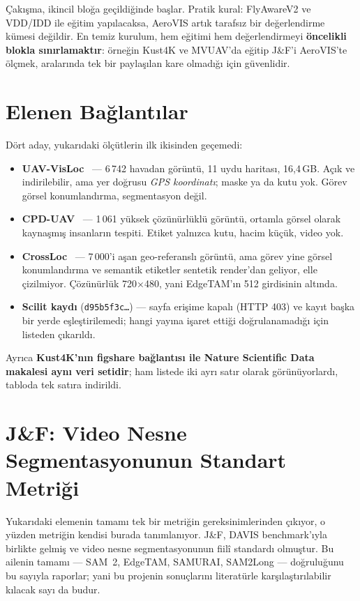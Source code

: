 Çakışma, ikincil bloğa geçildiğinde başlar. Pratik kural: FlyAwareV2 ve
VDD/IDD ile eğitim yapılacaksa, AeroVIS artık tarafsız bir
değerlendirme kümesi değildir. En temiz kurulum, hem eğitimi hem
değerlendirmeyi \textbf{öncelikli blokla sınırlamaktır}: örneğin
Kust4K ve MVUAV'da eğitip J\&F'i AeroVIS'te ölçmek, aralarında tek bir
paylaşılan kare olmadığı için güvenlidir.

\section{Elenen Bağlantılar}
\label{sec:elenen-veri-setleri}

Dört aday, yukarıdaki ölçütlerin ilk ikisinden geçemedi:

\begin{itemize}
  \item \textbf{UAV-VisLoc}~\cite{uavvisloc2024} --- 6\,742 havadan
        görüntü, 11 uydu haritası, 16,4\,GB. Açık ve indirilebilir, ama
        yer doğrusu \emph{GPS koordinatı}; maske ya da kutu yok. Görev
        görsel konumlandırma, segmentasyon değil.
  \item \textbf{CPD-UAV}~\cite{cpduav2026} --- 1\,061 yüksek çözünürlüklü
        görüntü, ortamla görsel olarak kaynaşmış insanların tespiti.
        Etiket yalnızca kutu, hacim küçük, video yok.
  \item \textbf{CrossLoc}~\cite{yan2022crossloc} --- 7\,000'i aşan
        geo-referanslı görüntü, ama görev yine görsel konumlandırma ve
        semantik etiketler sentetik render'dan geliyor, elle
        çizilmiyor. Çözünürlük 720×480, yani EdgeTAM'ın 512 girdisinin
        altında.
  \item \textbf{Scilit kaydı} (\texttt{d95b5f3c\ldots}) --- sayfa
        erişime kapalı (HTTP 403) ve kayıt başka bir yerde
        eşleştirilemedi; hangi yayına işaret ettiği doğrulanamadığı için
        listeden çıkarıldı.
\end{itemize}

Ayrıca \textbf{Kust4K'nın figshare bağlantısı ile Nature Scientific
Data makalesi aynı veri setidir}; ham listede iki ayrı satır olarak
görünüyorlardı, tabloda tek satıra indirildi.

\section{J\&F: Video Nesne Segmentasyonunun Standart Metriği}
\label{sec:jf-metrigi}

Yukarıdaki elemenin tamamı tek bir metriğin gereksinimlerinden çıkıyor,
o yüzden metriğin kendisi burada tanımlanıyor. J\&F, DAVIS
benchmark'ıyla~\cite{perazzi2016davis,ponttuset2017davis} birlikte
gelmiş ve video nesne segmentasyonunun fiilî standardı olmuştur.
Bu ailenin tamamı --- SAM~2, EdgeTAM, SAMURAI, SAM2Long ---
doğruluğunu bu sayıyla raporlar; yani bu projenin sonuçlarını
literatürle karşılaştırılabilir kılacak sayı da budur.

